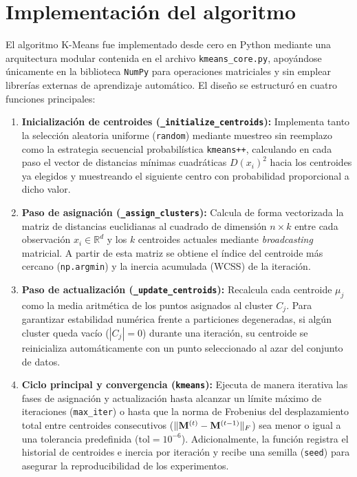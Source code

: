 \documentclass[11pt,letterpaper]{article}
\numberwithin{equation}{section}
\newcommand{\R}{\mathbb{R}}
\DeclarePairedDelimiter{\norm}{\lVert}{\rVert}
\theoremstyle{plain}
\begin{document}
\section{Implementación del algoritmo}

El algoritmo K-Means fue implementado desde cero en Python mediante una arquitectura modular contenida en el archivo \texttt{kmeans\_core.py}, apoyándose únicamente en la biblioteca \texttt{NumPy} para operaciones matriciales y sin emplear librerías externas de aprendizaje automático. El diseño se estructuró en cuatro funciones principales:

\begin{enumerate}
    \item \textbf{Inicialización de centroides (\texttt{\_initialize\_centroids}):} Implementa tanto la selección aleatoria uniforme (\texttt{random}) mediante muestreo sin reemplazo como la estrategia secuencial probabilística \texttt{kmeans++}, calculando en cada paso el vector de distancias mínimas cuadráticas $D(x_i)^2$ hacia los centroides ya elegidos y muestreando el siguiente centro con probabilidad proporcional a dicho valor.
    \item \textbf{Paso de asignación (\texttt{\_assign\_clusters}):} Calcula de forma vectorizada la matriz de distancias euclidianas al cuadrado de dimensión $n \times k$ entre cada observación $x_i \in \R^d$ y los $k$ centroides actuales mediante \textit{broadcasting} matricial. A partir de esta matriz se obtiene el índice del centroide más cercano (\texttt{np.argmin}) y la inercia acumulada (WCSS) de la iteración.
    \item \textbf{Paso de actualización (\texttt{\_update\_centroids}):} Recalcula cada centroide $\mu_j$ como la media aritmética de los puntos asignados al cluster $C_j$. Para garantizar estabilidad numérica frente a particiones degeneradas, si algún cluster queda vacío ($|C_j| = 0$) durante una iteración, su centroide se reinicializa automáticamente con un punto seleccionado al azar del conjunto de datos.
    \item \textbf{Ciclo principal y convergencia (\texttt{kmeans}):} Ejecuta de manera iterativa las fases de asignación y actualización hasta alcanzar un límite máximo de iteraciones (\texttt{max\_iter}) o hasta que la norma de Frobenius del desplazamiento total entre centroides consecutivos ($\norm{\mathbf{M}^{(t)} - \mathbf{M}^{(t-1)}}_F$) sea menor o igual a una tolerancia predefinida ($\mathrm{tol} = 10^{-6}$). Adicionalmente, la función registra el historial de centroides e inercia por iteración y recibe una semilla (\texttt{seed}) para asegurar la reproducibilidad de los experimentos.
\end{enumerate}
\end{document}

